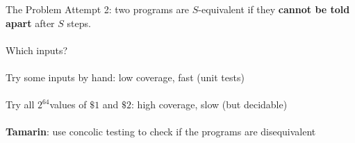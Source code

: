 \documentclass[pdf]{beamer}
\begin{document}
\begin{frame}{The Problem}
Attempt 2: two programs are $S$-equivalent if they \textbf{cannot be told apart} after $S$ steps.
\\~\\
Which inputs?
\pause 
\\~\\
Try some inputs by hand: low coverage, fast (unit tests)
\pause
\\~\\
Try all $2^{64}$values of $\$1$ and $\$2$: high coverage, slow (but decidable)
\pause
\\~\\
\textbf{Tamarin}: use concolic testing to check if the programs are disequivalent
\end{frame}
\end{document}
